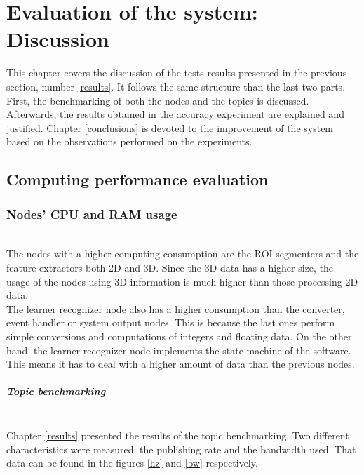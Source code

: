 \chapter{Evaluation of the system: Discussion}
\label{discussion}

This chapter covers the discussion of the tests results presented in the previous section, number \ref{results}.
It follows the same structure than the last two parts. 
First, the benchmarking of both the nodes and the topics is discussed. 
Afterwards, the results obtained in the accuracy experiment are explained and justified. 
Chapter \ref{conclusions} is devoted to the improvement of the system based on the observations performed on the experiments. 

\section{Computing performance evaluation}
	\subsection{Nodes' CPU and RAM usage}
		\\

			The nodes with a higher computing consumption are the ROI segmenters and the feature extractors both 2D and 3D. 
			Since the 3D data has a higher size, the usage of the nodes using 3D information is much higher than those processing 2D data. 
			\\
			The learner recognizer node also has a higher consumption than the converter, event handler or system output nodes. 
			This is because the last ones perform simple conversions and computations of integers and floating data. 
			On the other hand, the learner recognizer node implements the state machine of the software. 
			This means it has to deal with a higher amount of data than the previous nodes. 




		\paragraph{Topic benchmarking}\mbox{}\\

			Chapter \ref{results} presented the results of the topic benchmarking. 
			Two different characteristics were measured: the publishing rate and the bandwidth used. 
			That data can be found in the figures \ref{hz} and \ref{bw} respectively. 
			\\

